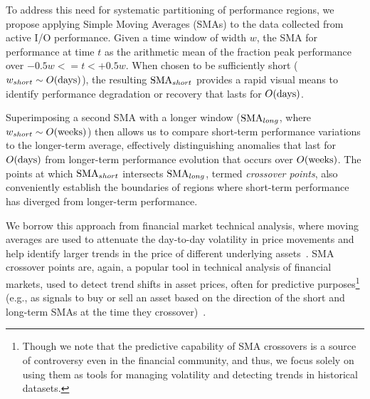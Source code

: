 To address this need for systematic partitioning of performance regions, we propose applying Simple Moving Averages (SMAs) to the data collected from active I/O performance.
Given a time window of width $w$, the SMA for performance at time $t$ as the arithmetic mean of the fraction peak performance over ${-0.5w <= t < +0.5w}$.
When chosen to be sufficiently short (${w_{short} \sim O(\textup{days})}$), the resulting $\textup{SMA}_{short}$ provides a rapid visual means to identify performance degradation or recovery that lasts for $O(\textup{days})$.







Superimposing a second SMA with a longer window ($\textup{SMA}_{long}$, where ${w_{short} \sim O(\textup{weeks})}$) then allows us to compare short-term performance variations to the longer-term average, effectively distinguishing anomalies that last for $O(\textup{days})$ from longer-term performance evolution that occurs over $O(\textup{weeks})$.
The points at which $\textup{SMA}_{short}$ intersects $\textup{SMA}_{long}$, termed \emph{crossover points}, also conveniently establish the boundaries of regions where short-term performance has diverged from longer-term performance.

We borrow this approach from financial market technical analysis, where moving averages are used to attenuate the day-to-day volatility in price movements and help identify larger trends in the price of different underlying assets~\cite{james1968monthly,gunasekarage2001profitability}.
SMA crossover points are, again, a popular tool in technical analysis of financial markets, used to detect trend shifts in asset prices, often for predictive purposes\footnote{Though we note that the predictive capability of SMA crossovers is a source of controversy even in the financial community, and thus, we focus solely on using them as tools for managing volatility and detecting trends in historical datasets.} (e.g., as signals to buy or sell an asset based on the direction of the short and long-term SMAs at the time they crossover)~\cite{brock1992simple}.






